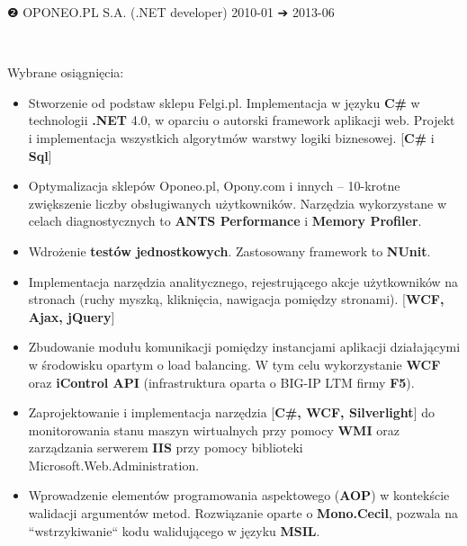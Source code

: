 \documentclass[a4paper,11pt]{article}
\newcommand{\cvEnuItemBox}[1]
{%
	\hspace{26pt}\parbox{.93\textwidth}{#1}
}
\newcommand{\cvSectionEntry}[1]
{%
	\vspace{-1pt}\noindent\setlength{\fboxsep}{0pt}\setlength{\fboxrule}{0pt}%
	\colorbox{bg}
	{%
		\color{fg}%
		\begin{minipage}[t]{\textwidth}
			#1 %
		\end{minipage}%
	}%
}
\newcommand{\cvSectionEntryHeader}[4]
{%
	\vspace{8pt}\hspace{26pt}\parbox{.93\textwidth}
	{%
		\fontsize{13pt}{1em}\selectfont #1 \hspace{2pt} #2 \hfill #3 {\segoesym ➔} #4 %
	}\\
}
\newcommand{\cvSectionEntryBody}[2]
{%
	\cvEnuItemBox{\hspace{27pt}#1#2}
}
\begin{document}
\cvSectionEntry
{
	\cvSectionEntryHeader{❷}{OPONEO.PL S.A. (.NET developer)}{2010-01}{2013-06}

	\cvSectionEntryBody{Wybrane osiągnięcia:}
	{
		\begin{itemize}
			\setlength\itemsep{-1pt}
			\item Stworzenie od podstaw sklepu Felgi.pl. Implementacja w języku \textbf{C\#} w technologii \textbf{.NET} 4.0, w oparciu o autorski framework aplikacji web. Projekt i implementacja wszystkich algorytmów warstwy logiki biznesowej. [\textbf{C\#} i \textbf{Sql}]
			\item Optymalizacja sklepów Oponeo.pl, Opony.com i innych -- 10-krotne zwiększenie liczby obsługiwanych użytkowników. Narzędzia wykorzystane w celach diagnostycznych to \textbf{ANTS Performance} i \textbf{Memory Profiler}.
			\item Wdrożenie \textbf{testów jednostkowych}. Zastosowany framework to \textbf{NUnit}.
			\item Implementacja narzędzia analitycznego, rejestrującego akcje użytkowników na stronach (ruchy myszką, kliknięcia, nawigacja pomiędzy stronami). [\textbf{WCF, Ajax, jQuery}]
			\item Zbudowanie modułu komunikacji pomiędzy instancjami aplikacji działającymi w środowisku opartym o load balancing. W tym celu wykorzystanie \textbf{WCF} oraz \textbf{iControl API} (infrastruktura oparta o BIG-IP LTM firmy \textbf{F5}).
			\item Zaprojektowanie i implementacja narzędzia [\textbf{C\#, WCF, Silverlight}] do monitorowania stanu maszyn wirtualnych przy pomocy \textbf{WMI} oraz zarządzania serwerem \textbf{IIS} przy pomocy biblioteki Microsoft.Web.Administration.
			\item Wprowadzenie elementów programowania aspektowego (\textbf{AOP}) w kontekście walidacji argumentów metod. Rozwiązanie oparte o \textbf{Mono.Cecil}, pozwala na ``wstrzykiwanie`` kodu walidującego w języku \textbf{MSIL}.
		\end{itemize}
	}
	\vspace{28pt}
}
\end{document}
